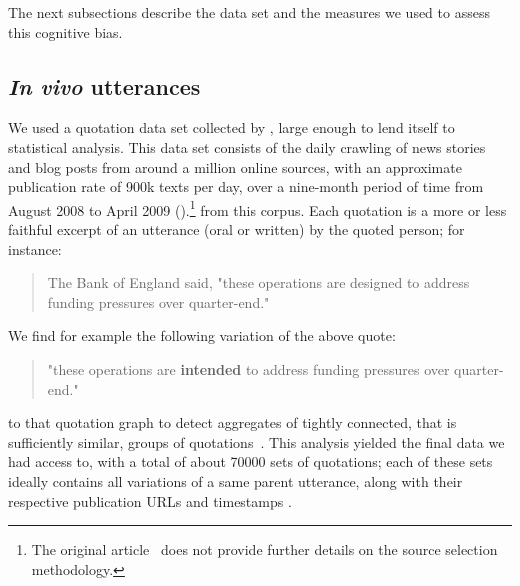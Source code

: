 The next subsections describe the data set and the measures we used to assess this cognitive bias.

\subsection{\emph{In vivo} utterances}

We used a quotation data set collected by \citet{leskovec_meme-tracking_2009}, large enough to lend itself to statistical analysis.
This data set consists of the daily crawling of news stories and blog posts from around a million online sources, with an approximate publication rate of 900k texts per day, over a nine-month period of time from August 2008 to April 2009 (\citealp{leskovec_memetracker:_2009}).\footnote{
The original article~\citep{leskovec_meme-tracking_2009} does not provide further details on the source selection methodology.
}
 from this corpus.
Each quotation is a more or less faithful excerpt of an utterance (oral or written) by the quoted person; for instance:
\begin{quote}
The Bank of England said, "these operations are designed to address funding pressures over quarter-end."
\end{quote}

We find for example the following variation of the above quote:
\begin{quote}
"these operations are \textbf{intended} to address funding pressures over quarter-end."
\end{quote}
 to that quotation graph to detect aggregates of tightly connected, that is sufficiently similar, groups of quotations~\citep[see again][for more details]{leskovec_meme-tracking_2009}.
This analysis yielded the final data we had access to, with a total of about \num{70000} sets of quotations; each of these sets ideally contains all variations of a same parent utterance, along with their respective publication URLs and timestamps .

